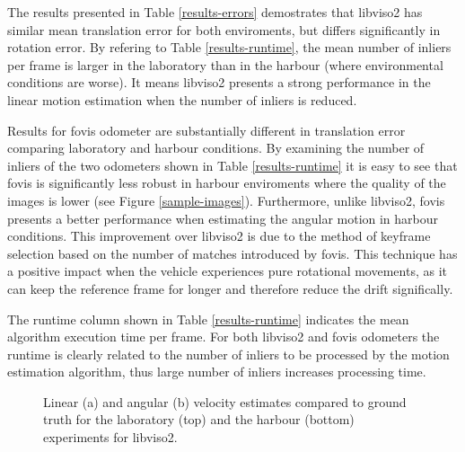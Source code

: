 \documentclass[conference]{IEEEtran}
\begin{document}
The results presented in Table \ref{results-errors} demostrates that libviso2 has similar mean translation error for both enviroments, but differs significantly in rotation error. By refering to Table \ref{results-runtime}, the mean number of inliers per frame is larger in the laboratory than in the harbour (where environmental conditions are worse). It means libviso2 presents a strong performance in the linear motion estimation when the number of inliers is reduced.

Results for fovis odometer are substantially different in translation error comparing laboratory and harbour conditions. By examining the number of inliers of the two odometers shown in Table \ref{results-runtime} it is easy to see that fovis is significantly less robust in harbour enviroments where the quality of the images is lower (see Figure \ref{sample-images}). Furthermore, unlike libviso2, fovis presents a better performance when estimating the angular motion in harbour conditions. This improvement over libviso2 is due to the method of keyframe selection based on the number of matches introduced by fovis. This technique has a positive impact when the vehicle experiences pure rotational movements, as it can keep the reference frame for longer and therefore reduce the drift significally.

The runtime column shown in Table \ref{results-runtime} indicates the mean algorithm execution time per frame. For both libviso2 and fovis odometers the runtime is clearly related to the number of inliers to be processed by the motion estimation algorithm, thus large number of inliers increases processing time.

\begin{figure}
  \begin{center}
  \end{center}
  \caption{Linear (a) and angular (b) velocity estimates compared to ground truth for the laboratory (top) and the harbour (bottom) experiments for libviso2.}
  \label{error-plots-viso2}
\end{figure}
\end{document}
